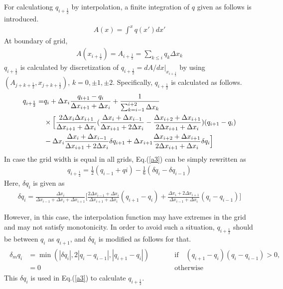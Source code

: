 For calculationg \(q_{i+\frac{1}{2}}\) by interpolation, a finite integration of \(q\) given as follows is introduced. \begin{eqnarray}A(x)= \int^{x} q(x') dx'\end{eqnarray} At boundary of grid,
\begin{eqnarray}A(x_{i+\frac{1}{2}})=A_{i+\frac{1}{2}}=\sum_{k\leq i}q_{k}\Delta x_{k}\end{eqnarray} \(q_{i+\frac{1}{2}}\) is calculated by discretization of \(q_{i+\frac{1}{2}}=dA/dx |_{x_{i+\frac{1}{2}}}\) by using
\((A_{j+k+\frac{1}{2}},x_{j+k+\frac{1}{2}})\), \(k=0,\pm 1, \pm 2\). Specifically, \(q_{i+\frac{1}{2}}\) is calculated as follows. \begin{eqnarray}\label{a3}
  \begin{split}
    q_{i+\frac{1}{2}}=&q_{i}+\Delta x_{i} \frac{q_{i+1}-q_{i}}{\Delta x_{i+1}+\Delta x_{i}}+\frac{1}{\sum_{k=i-1}^{i+2}\Delta x_{k}}\\
    &\times \Bigl[\frac{2\Delta x_{i}\Delta x_{i+1}}{\Delta x_{i+1}+\Delta x_{i}}(\frac{\Delta x_{i}+\Delta x_{i-1}}{\Delta x_{i+1}+2\Delta x_{i}}-\frac{\Delta x_{i+2}+\Delta x_{i+1}}{2\Delta x_{i+1}+\Delta x_{i}})(q_{i+1}-q_{i})\\
     & -\Delta x_{i}\frac{\Delta x_{i}+\Delta x_{i-1}}{\Delta x_{i+1}+2\Delta x_{i}} \delta q_{i+1}+\Delta x_{i+1} \frac{\Delta x_{i+2}+\Delta x_{i+1}}{2\Delta x_{i+1}+\Delta x_{i}} \delta q_{i}\Bigr]
  \end{split}\end{eqnarray} In case the grid width is equal in all grids, Eq.(\ref{a3}) can be simply rewritten as
\begin{eqnarray}q_{i+\frac{1}{2}}=\frac{1}{2}(q_{i-1}+q{i})-\frac{1}{6}(\delta q_{i}-\delta q_{i-1})\end{eqnarray} Here, \(\delta q_{i}\) is given as
\begin{eqnarray}\delta q_{i}=\frac{\Delta x_{i}}{\Delta x_{i-1}+\Delta x_{i}+\Delta x_{i+1}}\biggl[\frac{2\Delta x_{i-1}+\Delta x_{i}}{\Delta x_{i+1}+\Delta x_{i}}(q_{i+1}-q_{i})+\frac{\Delta x_{i}+2\Delta x_{i+1}}{\Delta x_{i-1}+\Delta x_{i}}(q_{i}-q_{i-1})\biggr]\end{eqnarray}

However, in this case, the interpolation function may have extremes in the grid and may not satisfy monotonicity. In order to avoid such a situation, \(q_{i+\frac{1}{2}}\) should be between \(q_{i}\)
as \(q_{i+1}\), and \(\delta q_{i}\) is modified as follows for that. \begin{eqnarray}\begin{aligned}
    \delta_{m} q_{i} & =\min(|\delta
    q_{i}|,2|q_{i}-q_{i-1}|,|q_{i+1}-q_{i}|) && \qquad \text{if$\quad(q_{i+1}-q_{i})(q_{i}-q_{i-1}) >0$}, \\
    & =0 && \qquad \text{otherwise}
  \end{aligned}\end{eqnarray} This \(\delta q_{i}\) is used in Eq.(\ref{a3}) to calculate \(q_{i+\frac{1}{2}}\).

